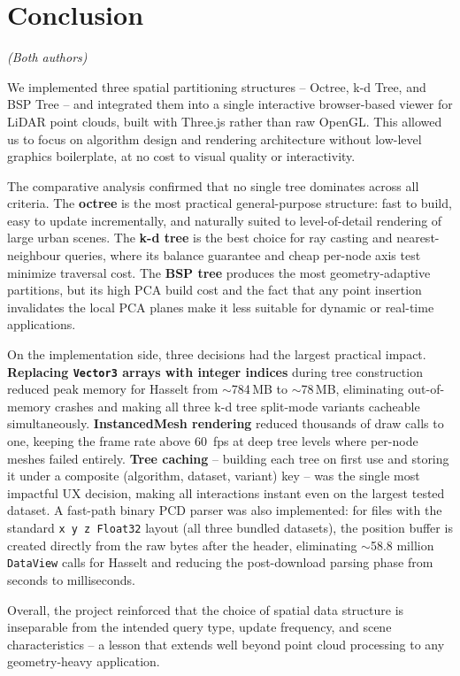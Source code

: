 \documentclass[12pt,a4paper]{article}
\begin{document}
\section{Conclusion}
\textit{(Both authors)}

We implemented three spatial partitioning structures -- Octree, k-d Tree, and
BSP Tree -- and integrated them into a single interactive browser-based viewer
for LiDAR point clouds, built with Three.js rather than raw OpenGL. This
allowed us to focus on algorithm design and rendering architecture without
low-level graphics boilerplate, at no cost to visual quality or interactivity.

The comparative analysis confirmed that no single tree dominates across all
criteria. The \textbf{octree} is the most practical general-purpose structure:
fast to build, easy to update incrementally, and naturally suited to
level-of-detail rendering of large urban scenes. The \textbf{k-d tree} is the
best choice for ray casting and nearest-neighbour queries, where its balance
guarantee and cheap per-node axis test minimize traversal cost. The
\textbf{BSP tree} produces the most geometry-adaptive partitions, but its
high PCA build cost and the fact that any point insertion invalidates the local
PCA planes make it less suitable for dynamic or real-time applications.

On the implementation side, three decisions had the largest practical impact.
\textbf{Replacing \texttt{Vector3} arrays with integer indices} during tree
construction reduced peak memory for Hasselt from $\sim$784\,MB to $\sim$78\,MB,
eliminating out-of-memory crashes and making all three k-d tree split-mode
variants cacheable simultaneously.
\textbf{InstancedMesh rendering} reduced thousands of draw calls to one,
keeping the frame rate above 60~fps at deep tree levels where per-node meshes
failed entirely.
\textbf{Tree caching} -- building each tree on first use and storing it under a
composite (algorithm, dataset, variant) key -- was the single most impactful UX
decision, making all interactions instant even on the largest tested dataset.
A fast-path binary PCD parser was also implemented: for files with the standard
\texttt{x~y~z~Float32} layout (all three bundled datasets), the position buffer
is created directly from the raw bytes after the header, eliminating $\sim$58.8
million \texttt{DataView} calls for Hasselt and reducing the post-download
parsing phase from seconds to milliseconds.

Overall, the project reinforced that the choice of spatial data structure is
inseparable from the intended query type, update frequency, and scene
characteristics -- a lesson that extends well beyond point cloud processing to
any geometry-heavy application.
\end{document}
